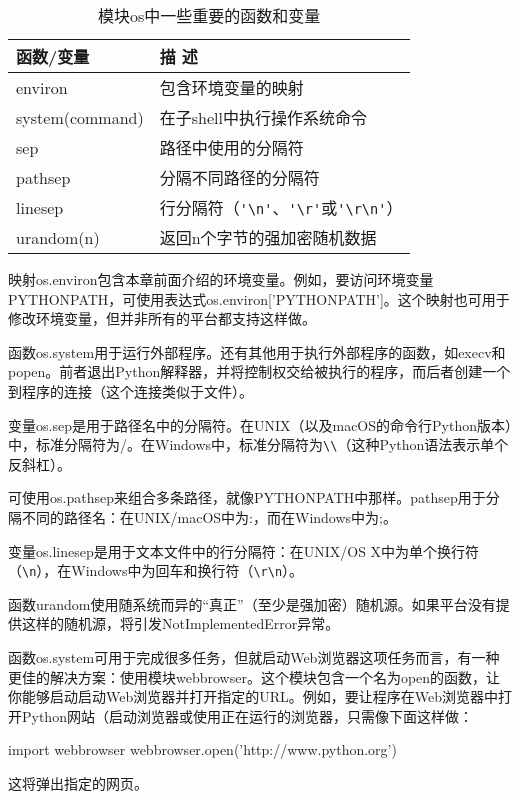 \begin{table}
    \centering
    \caption{模块os中一些重要的函数和变量}
    \label{os}
    \begin{tabular}{ll}
        \hline
        函数/变量           & 描 述                                         \\
        \hline
        environ         & 包含环境变量的映射                                   \\
        system(command) & 在子shell中执行操作系统命令                            \\
        sep             & 路径中使用的分隔符                                   \\
        pathsep         & 分隔不同路径的分隔符                                  \\
        linesep         & 行分隔符（\verb|'\n'|、\verb|'\r'|或\verb|'\r\n'|） \\
        urandom(n)      & 返回n个字节的强加密随机数据                              \\
        \hline
    \end{tabular}
\end{table}

映射os.environ包含本章前面介绍的环境变量。例如，要访问环境变量PYTHONPATH，可使用表达式os.environ['PYTHONPATH']。这个映射也可用于修改环境变量，但并非所有的平台都支持这样做。

函数os.system用于运行外部程序。还有其他用于执行外部程序的函数，如execv和popen。前者退出Python解释器，并将控制权交给被执行的程序，而后者创建一个到程序的连接（这个连接类似于文件）。

变量os.sep是用于路径名中的分隔符。在UNIX（以及macOS的命令行Python版本）中，标准分隔符为/。在Windows中，标准分隔符为\verb|\\|（这种Python语法表示单个反斜杠）。

可使用os.pathsep来组合多条路径，就像PYTHONPATH中那样。pathsep用于分隔不同的路径名：在UNIX/macOS中为:，而在Windows中为;。

变量os.linesep是用于文本文件中的行分隔符：在UNIX/OS X中为单个换行符（\verb|\n|），在Windows中为回车和换行符（\verb|\r\n|）。

函数urandom使用随系统而异的“真正”（至少是强加密）随机源。如果平台没有提供这样的随机源，将引发NotImplementedError异常。

\begin{tcolorbox}[title=webbrowser]
函数os.system可用于完成很多任务，但就启动Web浏览器这项任务而言，有一种更佳的解决方案：使用模块webbrowser。这个模块包含一个名为open的函数，让你能够启动启动Web浏览器并打开指定的URL。例如，要让程序在Web浏览器中打开Python网站（启动浏览器或使用正在运行的浏览器，只需像下面这样做：
\begin{pyc}
import webbrowser
webbrowser.open('http://www.python.org')
\end{pyc}
这将弹出指定的网页。
\end{tcolorbox}
